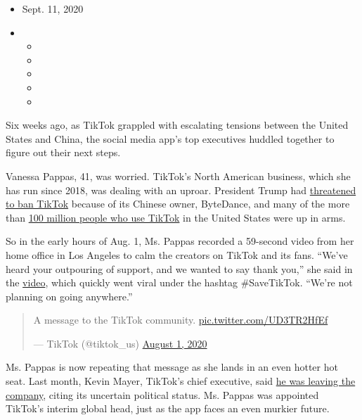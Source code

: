 \begin{itemize}
\item
  Sept. 11, 2020
\item
  \begin{itemize}
  \item
  \item
  \item
  \item
  \item
  \end{itemize}
\end{itemize}

Six weeks ago, as TikTok grappled with escalating tensions between the
United States and China, the social media app's top executives huddled
together to figure out their next steps.

Vanessa Pappas, 41, was worried. TikTok's North American business, which
she has run since 2018, was dealing with an uproar. President Trump had
\href{https://www.nytimes3xbfgragh.onion/2020/08/03/technology/trump-tiktok-microsoft.html}{threatened
to ban TikTok} because of its Chinese owner, ByteDance, and many of the
more than
\href{https://www.nytimes3xbfgragh.onion/2020/08/02/style/tiktok-ban-threat-trump.html}{100
million people who use TikTok} in the United States were up in arms.

So in the early hours of Aug. 1, Ms. Pappas recorded a 59-second video
from her home office in Los Angeles to calm the creators on TikTok and
its fans. ``We've heard your outpouring of support, and we wanted to say
thank you,'' she said in the
\href{https://twitter.com/tiktok_us/status/1289565422350553091}{video},
which quickly went viral under the hashtag \#SaveTikTok. ``We're not
planning on going anywhere.''

\begin{quote}
A message to the TikTok community.
\href{https://t.co/UD3TR2HfEf}{pic.twitter.com/UD3TR2HfEf}

--- TikTok (@tiktok\_us)
\href{https://twitter.com/tiktok_us/status/1289565422350553091?ref_src=twsrc\%5Etfw}{August
1, 2020}
\end{quote}

Ms. Pappas is now repeating that message as she lands in an even hotter
hot seat. Last month, Kevin Mayer, TikTok's chief executive, said
\href{https://www.nytimes3xbfgragh.onion/2020/08/27/technology/tiktok-kevin-mayer-resign.html}{he
was leaving the company}, citing its uncertain political status. Ms.
Pappas was appointed TikTok's interim global head, just as the app faces
an even murkier future.

